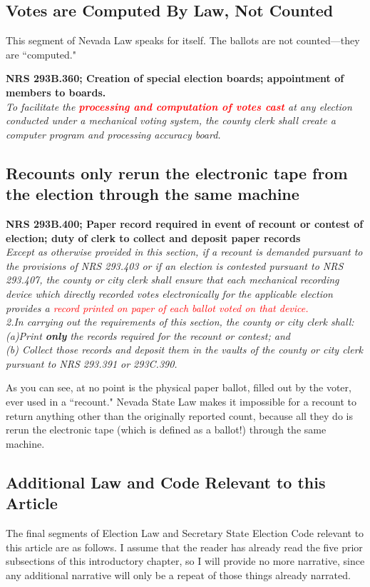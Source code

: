 \subsection{Votes are Computed By Law, Not Counted}
This segment of Nevada Law speaks for itself. The ballots are not counted---they are ``computed."

\textbf{NRS 293B.360; Creation of special election boards; appointment of members to boards.}\\
\textit{To facilitate the \textcolor{red}{\textbf{processing and computation of votes cast}} at any election conducted under a mechanical voting system, the county clerk shall create a computer program and processing accuracy board.}

\subsection{Recounts only rerun the electronic tape from the election through the same machine}

\textbf{NRS 293B.400; Paper record required in event of recount or contest of election; duty of clerk to collect and deposit paper records}\\
\textit{Except as otherwise provided in this section, if a recount is demanded pursuant to the provisions of NRS 293.403 or if an election is contested pursuant to NRS 293.407, the county or city clerk shall ensure that each mechanical recording device which directly recorded votes electronically for the applicable election provides a \textcolor{red}{record printed on paper of each ballot voted on that device.}\\
2.In carrying out the requirements of this section, the county or city clerk shall:\\
(a)Print \textbf{only} the records required for the recount or contest; and\\
(b) Collect those records and deposit them in the vaults of the county or city clerk pursuant to NRS 293.391 or 293C.390.}

As you can see, at no point is the physical paper ballot, filled out by the voter, ever used in a ``recount." Nevada State Law makes it impossible for a recount to return anything other than the originally reported count, because all they do is rerun the electronic tape (which is defined as a ballot!) through the same machine.

\subsection{Additional Law and Code Relevant to this Article}
The final segments of Election Law and Secretary State Election Code relevant to this article are as follows. I assume that the reader has already read the five prior subsections of this introductory chapter, so I will provide no more narrative, since any additional narrative will only be a repeat of those things already narrated.

